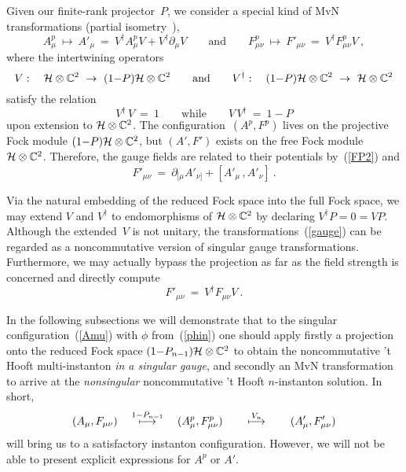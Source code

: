 \documentclass[a4paper,11pt]{article}
\numberwithin{equation}{section}
\newcommand{\C}{\mathbb C}
\newcommand{\Hcal}{{\cal H}}
\def\pa{\mbox{$\partial$}}
\def\+{\dagger}
\begin{document}
{Given our finite-rank projector~$P$,
we consider a special kind of MvN transformations 
(partial isometry~\cite{Harvey}),
\begin{equation}\label{gauge}
A^p_\mu\ \mapsto\  A'_\mu\ =\ V^\+ A^p_\mu V + V^\+\pa_\mu V
\qquad \textrm{and}\qquad  
F^p_{\mu\nu}\ \mapsto\ F'_{\mu\nu}\ =\ V^\+ F_{\mu\nu}^p V\ ,
\end{equation}
where the intertwining operators 
\begin{equation}
V: \quad \Hcal\otimes\C^2\ \to\ (1{-}P)\Hcal\otimes\C^2
\qquad\textrm{and}\qquad
V^\+: \quad (1{-}P)\Hcal\otimes\C^2\ \to\ \Hcal\otimes\C^2
\end{equation}
satisfy the relation
\begin{equation}\label{V}
V^\+\,V\ =\ 1 \qquad\textrm{while}\qquad
V\,V^\+\ =\ 1-P
\end{equation}
upon extension to $\Hcal\otimes\C^2$.
The configuration~$(A^p,F^p)$ lives on the projective Fock module 
$(1{-}P)\Hcal\otimes\C^2$, but $(A',F')$ exists on the free Fock module 
$\Hcal\otimes\C^2$. 
Therefore, the gauge fields are related to their potentials by~(\ref{FP2}) and
\begin{equation}
F'_{\mu\nu}\ =\ \pa^{\phantom{'}}_{[\mu} A'_{\nu]} + [A'_\mu\,,A'_\nu]\ .
\end{equation}

Via the natural embedding of the reduced Fock space into the full Fock space,
we may extend $V$ and $V^\+$ to endomorphisms of $\Hcal\otimes\C^2$ by
declaring $V^\+P=0=VP$.
Although the extended~$V$ is not unitary, the transformations~(\ref{gauge})
can be regarded as a noncommutative version of singular gauge transformations.
Furthermore, we may actually bypass the projection as far as the field strength
is concerned and directly compute
\begin{equation}\label{ext}
F'_{\mu\nu}\ =\ V^\+ F_{\mu\nu} V\ .
\end{equation}

In the following subsections we will demonstrate that 
to the singular configuration~(\ref{Amu}) with $\phi$ from~(\ref{phin}) 
one should apply firstly a projection onto the reduced Fock space
$(1{-}P_{n-1})\Hcal\otimes\C^2$ to obtain the noncommutative 't Hooft
multi-instanton {\it in a singular gauge\/}, 
and secondly an MvN transformation to arrive at the {\it nonsingular\/} 
noncommutative 't Hooft $n$-instanton solution. In short,
\begin{equation}
(A_\mu,F_{\mu\nu})\quad\buildrel{1-P_{n-1}}\over\longmapsto\quad 
(A^p_\mu,F^p_{\mu\nu})\qquad\buildrel{V_n}\over\longmapsto\qquad 
(A'_\mu,F'_{\mu\nu})
\end{equation}
will bring us to a satisfactory instanton configuration.
However, we will not be able to present explicit expressions for
$A^p$ or $A'$.


}
\end{document}
